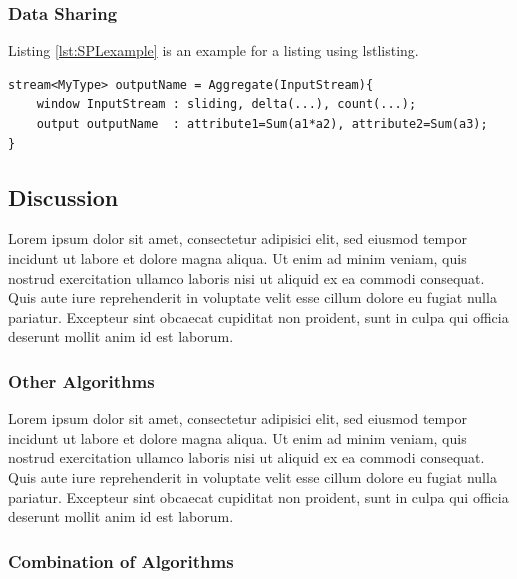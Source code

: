 \subsubsection{Data Sharing}
\label{sec:Listings}

Listing \ref{lst:SPLexample} is an example for a listing using lstlisting.

\begin{lstlisting}[float=b,label=lst:SPLexample,caption={An IBM SPL code example}]
stream<MyType> outputName = Aggregate(InputStream){
	window InputStream : sliding, delta(...), count(...);
	output outputName  : attribute1=Sum(a1*a2), attribute2=Sum(a3);
}
\end{lstlisting}

% 


\subsection{Discussion}
\label{sec:Discussion}

Lorem ipsum dolor sit amet, consectetur adipisici elit, sed eiusmod tempor incidunt ut labore et dolore magna aliqua. Ut enim ad minim veniam, quis nostrud exercitation ullamco laboris nisi ut aliquid ex ea commodi consequat. Quis aute iure reprehenderit in voluptate velit esse cillum dolore eu fugiat nulla pariatur. Excepteur sint obcaecat cupiditat non proident, sunt in culpa qui officia deserunt mollit anim id est laborum.

\subsubsection{Other Algorithms}
\label{sec:Listings}

Lorem ipsum dolor sit amet, consectetur adipisici elit, sed eiusmod tempor incidunt ut labore et dolore magna aliqua. Ut enim ad minim veniam, quis nostrud exercitation ullamco laboris nisi ut aliquid ex ea commodi consequat. Quis aute iure reprehenderit in voluptate velit esse cillum dolore eu fugiat nulla pariatur. Excepteur sint obcaecat cupiditat non proident, sunt in culpa qui officia deserunt mollit anim id est laborum.


\subsubsection{Combination of Algorithms}
\label{sec:Listings}

